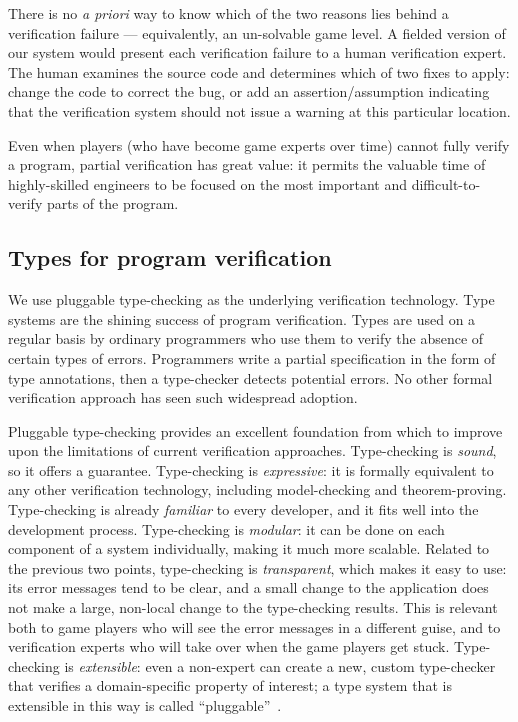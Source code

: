 \documentclass{sig-alternate}
\begin{document}
\noindent
There is no \emph{a priori} way to know which of the two reasons lies
behind a verification failure --- equivalently, an un-solvable game
level.  A fielded version of our system would present each verification failure to a human
verification expert.  The human examines the source code and
determines which of two fixes to apply: change the code to correct the
bug, or add an assertion/assumption indicating that the verification
system should not issue a warning at this particular location.


Even when players (who have become game experts over time) cannot fully
verify a program,
partial verification has great value: it permits the valuable time of
highly-skilled engineers to be focused on the most important and
difficult-to-verify parts of
the program.

\subsection{Types for program verification}

We use pluggable type-checking as the underlying verification
technology.  Type systems are the shining success of program
verification.  Types are used on a regular basis by ordinary
programmers who use them to verify the absence of certain types of
errors.  Programmers write a partial specification in the form of type
annotations, then a type-checker detects potential errors.  No other
formal verification approach has seen such widespread adoption.

Pluggable type-checking provides an excellent foundation from which to
improve upon the limitations of current verification
approaches. Type-checking is \emph{sound}, so it offers a guarantee.
Type-checking is \emph{expressive}: it is formally equivalent
\cite{CurryHoward2006,MartinLoef1984,CoquandHuet1988,Cousot1997,CousotCousot2000,NaikPalsberg2005}
to any other verification technology, including model-checking and
theorem-proving.  Type-checking is already \emph{familiar} to every
developer, and it fits well into the development process.
Type-checking is \emph{modular}: it can be done on each component of a
system individually, making it much more scalable.  Related to the
previous two points, type-checking is \emph{transparent}, which makes
it easy to use: its error messages tend to be clear, and a small
change to the application does not make a large, non-local change to
the type-checking results.  This is relevant both to game players who
will see the error messages in a different guise, and to verification
experts who will take over when the game players get stuck.
Type-checking is \emph{extensible}: even a non-expert can create a
new, custom type-checker that verifies a domain-specific property of
interest; a type system that is extensible in this way is called
``pluggable''~\cite{Bracha2004}.
\end{document}
